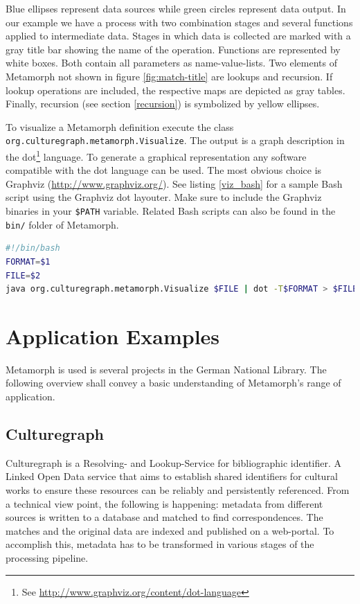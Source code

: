 \documentclass[12pt,a4paper]{article}
\begin{document}
Blue ellipses represent data sources while green circles represent data output. In our example we have a process with two combination stages and several functions applied to intermediate data. Stages in which data is collected are marked with a gray title bar showing the name of the operation. Functions are represented by white boxes. Both contain all parameters as name-value-lists. 
Two elements of Metamorph not shown in figure \ref{fig:match-title} are lookups and recursion. If lookup operations are included, the respective maps are depicted as gray tables. Finally, recursion (see section \ref{recursion}) is symbolized by yellow ellipses.

To visualize a Metamorph definition execute the class {\tt org.\-culturegraph.\-metamorph.\-Visualize}. The output is a graph description in the dot\footnote{See \url{http://www.graphviz.org/content/dot-language}} language. To generate a graphical representation any software compatible with the dot language can be used. The most obvious choice is Graphviz (\url{http://www.graphviz.org/}). See listing \ref{viz_bash} for a sample Bash script using the Graphviz dot layouter. Make sure to include the Graphviz binaries in your {\tt \$PATH} variable. Related Bash scripts can also be found in the {\tt bin/} folder of Metamorph.

\begin{lstlisting}[float=htb, label=viz_bash,caption=Simple Bash script for visualizing a Metamorph definition., language=Bash]
#!/bin/bash
FORMAT=$1
FILE=$2
java org.culturegraph.metamorph.Visualize $FILE | dot -T$FORMAT > $FILE.$FORMAT
\end{lstlisting}



\section{Application Examples}\label{apps}
 Metamorph is used is several projects in the German National Library. The following overview shall convey a basic understanding of Metamorph's range of application.

\subsection{Culturegraph}\label{culturegraph}
Culturegraph is a Resolving- and Lookup-Service for bibliographic identifier. A Linked Open Data service that aims to establish shared identifiers for cultural works to ensure these resources can be reliably and persistently referenced.
From a technical view point, the following is happening: metadata from different sources is written to a database and matched to find correspondences. The matches and the original data are indexed and published on a web-portal. To accomplish this, metadata has to be transformed in various stages of the processing pipeline.
\end{document}
